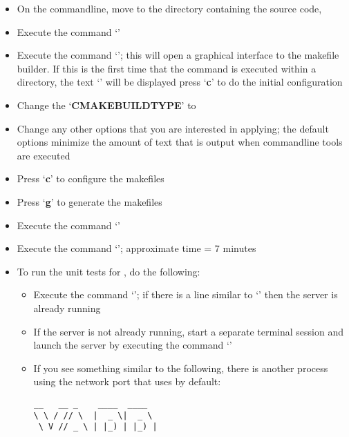 \tertiaryEnd{}
\TBD{}
\tertiaryEnd{}
\TBD{}
\tertiaryEnd{}
\secondaryEnd{}
\begin{itemize}
\item On the command\longDash{}line, move to the directory containing the \mplusm{} source
code, 
\item\exSp{} Execute the command `'
\item\exSp{} Execute the command `'; this will open a graphical interface
to the makefile builder. If this is the first time that the command is executed within a
directory, the text `' will be displayed \longDash{} press
`\textbf{c}' to do the initial configuration
\item\exSp{} Change the `\textbf{CMAKE\fUS{}BUILD\fUS{}TYPE}' to 
\item\exSp{} Change any other options that you are interested in applying; the default
options minimize the amount of text that is output when \mplusm{} command\longDash{}line
tools are executed
\item\exSp{} Press `\textbf{c}' to configure the makefiles
\item\exSp{} Press `\textbf{g}' to generate the makefiles
\item\exSp{} Execute the command `'
\item\exSp{} Execute the command `'; approximate time = 7
minutes
\item\exSp{} To run the unit tests for \mplusm{}, do the following:
\begin{itemize}
\item Execute the command `'; if there is a line
similar to `' then the \yarp{}
server is already running
\item\exSp{} If the \yarp{} server is not already running, start a separate terminal
session and launch the \yarp{} server by executing the command `'
\item\exSp{} If you see something similar to the following, there is another process using
the network port that \yarp{} uses by default:
\outputBegin{}
\begin{verbatim}
__   __ _    ____  ____  
\ \ / // \  |  _ \|  _ \ 
 \ V // _ \ | |_) | |_) |

\end{verbatim}
\end{itemize}
\end{itemize}
